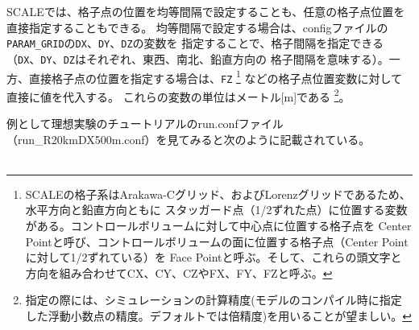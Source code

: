 SCALEでは、格子点の位置を均等間隔で設定することも、任意の格子点位置を直接指定することもできる。
均等間隔で設定する場合は、configファイルの\verb|PARAM_GRID|の\verb|DX|、\verb|DY|、\verb|DZ|の変数を
指定することで、格子間隔を指定できる（\verb|DX|、\verb|DY|、\verb|DZ|はそれぞれ、東西、南北、鉛直方向の
格子間隔を意味する）。一方、直接格子点の位置を指定する場合は、\verb|FZ|
\footnote{SCALEの格子系はArakawa-Cグリッド、およびLorenzグリッドであるため、水平方向と鉛直方向ともに
スタッガード点（1/2ずれた点）に位置する変数がある。コントロールボリュームに対して中心点に位置する格子点を
Center Pointと呼び、コントロールボリュームの面に位置する格子点（Center Pointに対して1/2ずれている）を
Face Pointと呼ぶ。そして、これらの頭文字と方向を組み合わせてCX、CY、CZやFX、FY、FZと呼ぶ。}
などの格子点位置変数に対して直接に値を代入する。
これらの変数の単位はメートル[m]である
\footnote{指定の際には、シミュレーションの計算精度(モデルのコンパイル時に指定した浮動小数点の精度。デフォルトでは倍精度)を用いることが望ましい。}。



例として理想実験のチュートリアルのrun.confファイル（run\_R20kmDX500m.conf）を見てみると次のように記載されている。\\

\\

